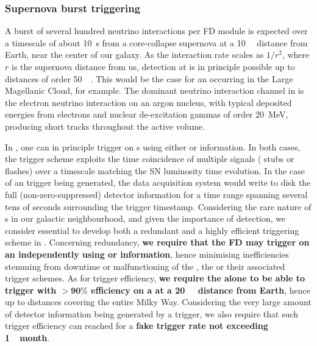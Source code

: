 \subsubsection{Supernova burst triggering}

A burst of several hundred neutrino interactions per  FD module is expected over a timescale of about \SI{10}{\s} from a core-collapse supernova at a \SI{10}{\kilo\parsec} distance from Earth, near the center of our galaxy. As the  interaction rate scales as $1/r^2$, where $r$ is the supernova distance from us,  detection at  is in principle possible up to distances of order \SI{50}{\kilo\parsec}. This would be the case for an  occurring in the Large Magellanic Cloud, for example. The dominant neutrino interaction channel in  is the  electron neutrino interaction on an argon nucleus, with typical deposited energies from electrons and nuclear de-excitation gammas of order 20~MeV, producing short tracks throughout the  active volume.

In , one can in principle trigger on s using either  or  information. In both cases, the trigger scheme exploits the time coincidence of multiple signals ( stubs or  flashes) over a timescale matching the SN luminosity time evolution. In the case of an  trigger being generated, the data acquisition system would write to disk the full (non-zero-suppressed) detector information for a time range spanning several tens of seconds surrounding the trigger timestamp. Considering the rare nature of s in our galactic neighbourhood, and given the importance of  detection, we consider essential to develop both a redundant and a highly efficient  triggering scheme in . Concerning redundancy, {\bf we require that the  FD may trigger on an  independently using  or  information}, hence minimising  inefficiencies stemming from downtime or malfunctioning of the , the  or their associated trigger schemes. As for trigger efficiency, {\bf we require the  alone to be able to trigger with $\boldsymbol{>90\%}$ efficiency on a  at a \SI{20}{\kilo\parsec} distance from Earth}, hence up to distances covering the entire Milky Way. Considering the very large amount of detector information being generated by a  trigger, we also require that such  trigger efficiency can reached for a {\bf fake trigger rate not exceeding \SI{1}{\per month}}.

